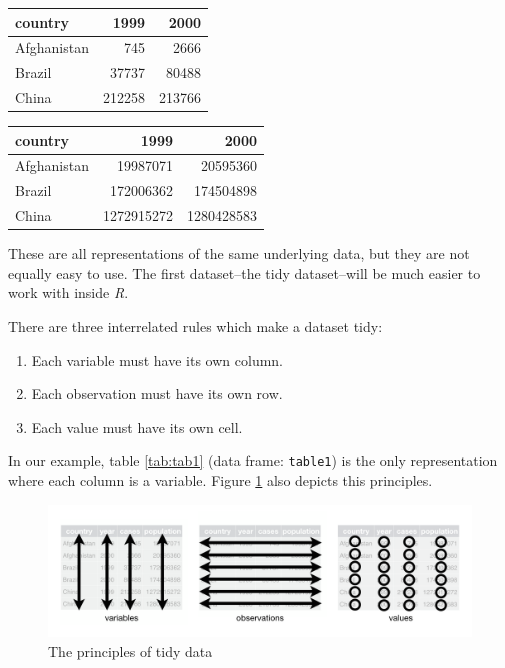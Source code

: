 \documentclass[
]{scrartcl}
\providecommand{\tightlist}{%
  \setlength{\itemsep}{0pt}\setlength{\parskip}{0pt}}
\begin{document}
\begin{table}
\caption{\label{tab:unnamed-chunk-189}The data spread over two tables: `table4a` (left) and `table4b` (right).  `table4a` contains the cases and `table4b` the populations.}

\begin{longtable}[t]{lrr}
\toprule
country & 1999 & 2000\\
\midrule
Afghanistan & 745 & 2666\\
Brazil & 37737 & 80488\\
China & 212258 & 213766\\
\bottomrule
\end{longtable}
\begin{longtable}[t]{lrr}
\toprule
country & 1999 & 2000\\
\midrule
Afghanistan & 19987071 & 20595360\\
Brazil & 172006362 & 174504898\\
China & 1272915272 & 1280428583\\
\bottomrule
\end{longtable}
\end{table}

These are all representations of the same underlying data, but they are not equally easy to use. The first dataset--the tidy dataset--will be much easier to work with inside \emph{R}.

There are three interrelated rules which make a dataset tidy:

\begin{enumerate}
\def\labelenumi{\arabic{enumi}.}
\tightlist
\item
  Each variable must have its own column.
\item
  Each observation must have its own row.
\item
  Each value must have its own cell.
\end{enumerate}

In our example, table \ref{tab:tab1} (data frame: \texttt{table1}) is the only representation where each column is a variable. Figure \ref{fig:tidydata} also depicts this principles.

\begin{figure}

{\centering \includegraphics[width=500px]{images/tidy-data} 

}

\caption{The principles of tidy data}\label{fig:tidydata}
\end{figure}
\end{document}
